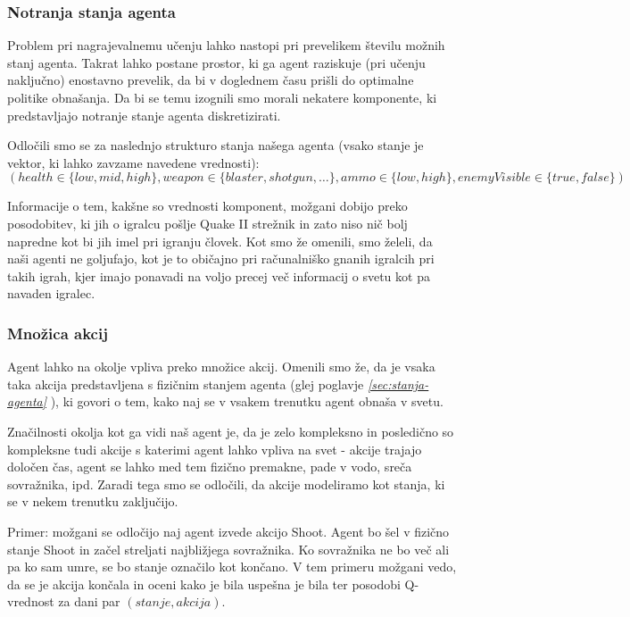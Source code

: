 \documentclass[a4paper,10pt]{article}
\begin{document}
\subsubsection{Notranja stanja agenta}

Problem pri nagrajevalnemu učenju lahko nastopi pri prevelikem številu možnih stanj agenta. Takrat lahko postane prostor, ki ga agent raziskuje (pri učenju naključno) enostavno prevelik, da bi v doglednem času prišli do optimalne politike obnašanja. Da bi se temu izognili smo morali nekatere komponente, ki predstavljajo notranje stanje agenta diskretizirati.

Odločili smo se za naslednjo strukturo stanja našega agenta (vsako stanje je vektor, ki lahko zavzame navedene vrednosti):
$$(health \in \{low, mid, high\}, weapon \in \{blaster, shotgun, \ldots\}, ammo \in \{low, high\}, enemyVisible \in \{true, false\})$$

\noindent
Informacije o tem, kakšne so vrednosti komponent, možgani dobijo preko posodobitev, ki jih o igralcu pošlje Quake II strežnik in zato niso nič bolj napredne kot bi jih imel pri igranju človek. Kot smo že omenili, smo želeli, da naši agenti ne goljufajo, kot je to običajno pri računalniško gnanih igralcih pri takih igrah, kjer imajo ponavadi na voljo precej več informacij o svetu kot pa navaden igralec.

\subsubsection{Množica akcij}

Agent lahko na okolje vpliva preko množice akcij. Omenili smo že, da je vsaka taka akcija predstavljena s fizičnim stanjem agenta (glej poglavje \textit{\ref{sec:stanja-agenta} }), ki govori o tem, kako naj se v vsakem trenutku agent obnaša v svetu.

Značilnosti okolja kot ga vidi naš agent je, da je zelo kompleksno in posledično so kompleksne tudi akcije s katerimi agent lahko vpliva na svet - akcije trajajo določen čas, agent se lahko med tem fizično premakne, pade v vodo, sreča sovražnika, ipd. Zaradi tega smo se odločili, da akcije modeliramo kot stanja, ki se v nekem trenutku zaključijo.

Primer: možgani se odločijo naj agent izvede akcijo Shoot. Agent bo šel v fizično stanje Shoot in začel streljati najbližjega sovražnika. Ko sovražnika ne bo več ali pa ko sam umre, se bo stanje označilo kot končano. V tem primeru možgani vedo, da se je akcija končala in oceni kako je bila uspešna je bila ter posodobi Q-vrednost za dani par $(stanje, akcija)$.
\end{document}
